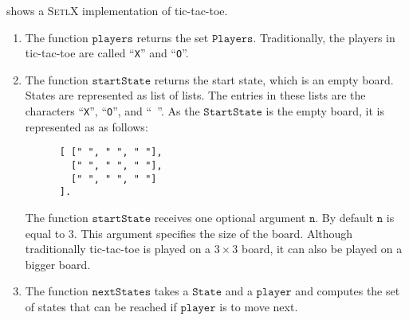  shows a \textsc{SetlX} implementation of tic-tac-toe.
\begin{enumerate}
\item The function $\mathtt{players}$ returns the set $\mathtt{Players}$.  Traditionally, the players in
      tic-tac-toe are called ``\texttt{X}'' and ``\texttt{O}''.
\item The function $\mathtt{startState}$ returns the start state, which is an empty board.
      States are represented as list of lists.  The entries in these lists are the characters 
      ``\texttt{X}'', ``\texttt{O}'', and ``\texttt{ }''.
      As the  $\mathtt{StartState}$ is the empty board, it is represented as as follows:
      \begin{Verbatim}
      [ [" ", " ", " "], 
        [" ", " ", " "], 
        [" ", " ", " "]
      ].     
      \end{Verbatim}
      The function $\mathtt{startState}$ receives one optional argument $\mathtt{n}$.
      By default $\mathtt{n}$ is equal to $3$.  This argument specifies the size of the board.
      Although traditionally tic-tac-toe is played on a $3 \times 3$ board, it can also 
      be played on a bigger board.
\item The function $\mathtt{nextStates}$ takes a $\mathtt{State}$ and a $\mathtt{player}$ and computes the set
      of states that can be reached if $\mathtt{player}$ is to move next.
\end{enumerate}





